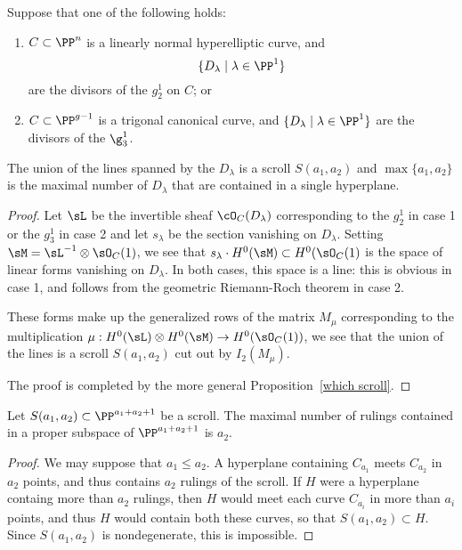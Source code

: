 \begin{corollary}\label{hyperelliptic and trigonal} Suppose that one of the following holds:
\begin{enumerate}
 \item  $C\subset \PP^n$ is a linearly normal hyperelliptic curve, and  
$$
\{D_\lambda \mid \lambda \in \PP^1\}
$$
are the divisors of the $g^1_2$ on $C$; or

\item $C\subset \PP^{g-1}$ is a trigonal canonical curve, and  
$\{D_\lambda \mid \lambda \in \PP^1\}$
are the divisors of the $\g^1_3$.
\end{enumerate}

The union of the lines spanned by the $D_\lambda$
is a scroll $S(a_1,a_2)$ and $\max\{a_1, a_2\}$ is the maximal number of
$D_\lambda$ that are contained in a single hyperplane.
\end{corollary}

\begin{proof}
Let $\sL$ be the invertible sheaf $\cO_C(D_\lambda)$ corresponding to the $g^1_2$ in case 1 or
the $g_3^1$ in case 2 and let $s_\lambda$ be
the section vanishing on $D_\lambda$. Setting $\sM =  \sL^{-1}\otimes \sO_C(1)$, we see that
$s_\lambda\cdot H^0(\sM) \subset H^0(\sO_C(1)$ is the space of linear forms vanishing on
$D_\lambda$. In both cases, this space is a line: this is obvious in case 1, and follows from the 
geometric Riemann-Roch theorem in case 2. 

These forms make up the
generalized rows of the matrix $M_\mu$ corresponding to the multiplication
$\mu: H^0(\sL)\otimes H^0(\sM) \to H^0(\sO_C(	1))$, we see that the union of the lines is a
scroll $S(a_1,a_2)$ cut out by $I_2(M_\mu)$.

The proof is completed by the more general Proposition~\ref{which scroll}.
\end{proof}

\begin{proposition}\label{which scroll}
Let $S(a_1,a_2)\subset \PP^{a_1+a_2+1}$ be a scroll. The maximal number of rulings contained in
a proper subspace of $ \PP^{a_1+a_2+1}$ is $a_2$.
\end{proposition}

\begin{proof}
We may suppose that $a_1\leq a_2$. A hyperplane containing $C_{a_1}$ meets $C_{a_2}$ in $a_2$
points, and thus contains $a_2$ rulings of the scroll. If $H$ were a hyperplane containg more than $a_2$
rulings, then $H$ would meet each curve $C_{a_i}$ in more than $a_i$ points, and thus $H$ would contain
both these curves, so that $S(a_1,a_2)\subset H$. Since $S(a_1,a_2)$ is nondegenerate, this is impossible.
\end{proof}


